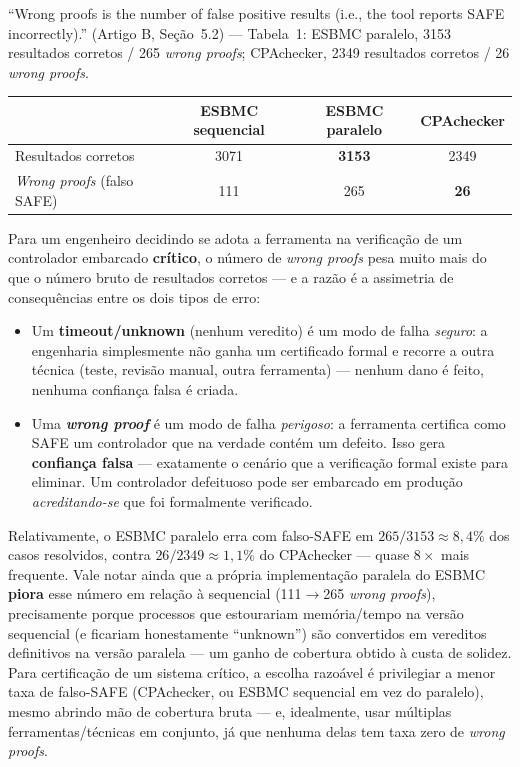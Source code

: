 \documentclass[12pt,a4paper]{article}
\begin{document}
\begin{tcolorbox}[quotebox]
``Wrong proofs is the number of false positive results (i.e., the tool reports SAFE
incorrectly).'' (Artigo B, Se\c{c}\~ao~5.2) --- Tabela~1: ESBMC paralelo, 3153 resultados
corretos / 265 \emph{wrong proofs}; CPAchecker, 2349 resultados corretos / 26 \emph{wrong
proofs}.
\end{tcolorbox}

\begin{center}
\begin{tabular}{@{}lccc@{}}
\toprule
& ESBMC sequencial & ESBMC paralelo & CPAchecker \\
\midrule
Resultados corretos & 3071 & \textbf{3153} & 2349 \\
\emph{Wrong proofs} (falso SAFE) & 111 & 265 & \textbf{26} \\
\bottomrule
\end{tabular}
\end{center}

\begin{tcolorbox}[resultbox]
Para um engenheiro decidindo se adota a ferramenta na verifica\c{c}\~ao de um controlador
embarcado \textbf{cr\'itico}, o n\'umero de \emph{wrong proofs} pesa muito mais do que o
n\'umero bruto de resultados corretos --- e a raz\~ao \'e a assimetria de consequ\^encias
entre os dois tipos de erro:
\begin{itemize}[leftmargin=1.6cm]
  \item Um \textbf{timeout/unknown} (nenhum veredito) \'e um modo de falha \emph{seguro}: a
  engenharia simplesmente n\~ao ganha um certificado formal e recorre a outra t\'ecnica
  (teste, revis\~ao manual, outra ferramenta) --- nenhum dano \'e feito, nenhuma confian\c{c}a
  falsa \'e criada.
  \item Uma \textbf{\emph{wrong proof}} \'e um modo de falha \emph{perigoso}: a ferramenta
  certifica como SAFE um controlador que na verdade cont\'em um defeito. Isso gera
  \textbf{confian\c{c}a falsa} --- exatamente o cen\'ario que a verifica\c{c}\~ao formal existe
  para eliminar. Um controlador defeituoso pode ser embarcado em produ\c{c}\~ao \emph{acreditando-se}
  que foi formalmente verificado.
\end{itemize}
Relativamente, o ESBMC paralelo erra com falso-SAFE em $265/3153\approx8{,}4\%$ dos casos
resolvidos, contra $26/2349\approx1{,}1\%$ do CPAchecker --- quase $8\times$ mais frequente.
Vale notar ainda que a pr\'opria implementa\c{c}\~ao paralela do ESBMC \textbf{piora} esse
n\'umero em rela\c{c}\~ao \`a sequencial (111$\to$265 \emph{wrong proofs}), precisamente porque
processos que estourariam mem\'oria/tempo na vers\~ao sequencial (e ficariam honestamente
``unknown'') s\~ao convertidos em vereditos definitivos na vers\~ao paralela --- um ganho de
cobertura obtido \`a custa de solidez. Para certifica\c{c}\~ao de um sistema cr\'itico, a
escolha razo\'avel \'e privilegiar a menor taxa de falso-SAFE (CPAchecker, ou ESBMC sequencial
em vez do paralelo), mesmo abrindo m\~ao de cobertura bruta --- e, idealmente, usar
m\'ultiplas ferramentas/t\'ecnicas em conjunto, j\'a que nenhuma delas tem taxa zero de
\emph{wrong proofs}.
\end{tcolorbox}
\end{document}
